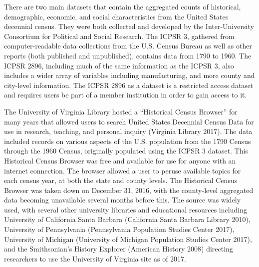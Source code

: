 \documentclass[11pt,]{article}
\begin{document}
There are two main datasets that contain the aggregated counts of
historical, demographic, economic, and social characteristics from the
United States decennial census. They were both collected and developed
by the Inter-University Consortium for Political and Social Research.
The ICPSR 3, gathered from computer-readable data collections from the
U.S. Census Bureau as well as other reports (both published and
unpublished), contains data from 1790 to 1960. The ICPSR 2896, including
much of the same information as the ICPSR 3, also includes a wider array
of variables including manufacturing, and more county and city-level
information. The ICPSR 2896 as a dataset is a restricted access dataset
and requires users be part of a member institution in order to gain
access to it.

The University of Virginia Library hosted a ``Historical Census
Browser'' for many years that allowed users to search United States
Decennial Census Data for use in research, teaching, and personal
inquiry (Virginia Library 2017). The data included records on various
aspects of the U.S. population from the 1790 Census through the 1960
Census, originally populated using the ICPSR 3 dataset. This Historical
Census Browser was free and available for use for anyone with an
internet connection. The browser allowed a user to peruse available
topics for each census year, at both the state and county levels. The
Historical Census Browser was taken down on December 31, 2016, with the
county-level aggregated data becoming unavailable several months before
this. The source was widely used, with several other university
libraries and educational resources including University of California
Santa Barbara (California Santa Barbara Library 2010), University of
Pennsylvania (Pennsylvania Population Studies Center 2017), University
of Michigan (University of Michigan Population Studies Center 2017), and
the Smithsonian's History Explorer (American History 2008) directing
researchers to use the University of Virginia site as of 2017.
\end{document}
